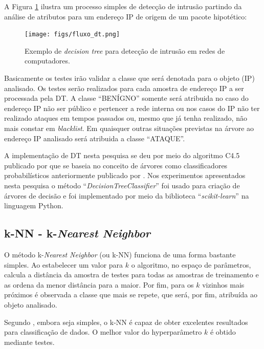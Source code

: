 A Figura \ref{fig:fluxo_dt} ilustra um processo simples de detecção de intrusão partindo da análise de atributos para um endereço IP de origem de um pacote hipotético:

\begin{figure}[H]
\caption{Exemplo de \textit{decision tree} para detecção de intrusão em redes de computadores.}
\centering
\texttt{[image: figs/fluxo\_dt.png]}
\newline {}\label{fig:fluxo_dt}
\end{figure}

Basicamente os testes irão validar a classe que será denotada para o objeto (IP) analisado. Os testes serão realizados para cada amostra de endereço IP a ser processada pela DT. A classe ``BENÍGNO'' somente será atribuida no caso do endereço IP não ser público e pertencer a rede interna ou nos casos do IP não ter realizado ataques em tempos passados ou, mesmo que já tenha realizado, não mais constar em \textit{blacklist}. Em quaisquer outras situações previstas na árvore ao endereço IP analisado será atribuida a classe ``ATAQUE''.

A implementação de DT nesta pesquisa se deu por meio do algoritmo C4.5 publicado por  que se baseia no conceito de árvores como classificadores probabilísticos anteriormente publicado por . Nos experimentos apresentados nesta pesquisa o método ``\textit{DecisionTreeClassifier}'' foi usado para criação de árvores de decisão e foi implementado por meio da biblioteca ``\textit{scikit-learn}'' na linguagem Python.






\subsection{k-NN - k-\textit{Nearest Neighbor}}
\label{knn}
O método k-\textit{Nearest Neighbor} (ou k-NN) funciona de uma forma bastante simples. Ao estabelecer um valor para $k$ o algoritmo, no espaço de parâmetros, calcula a distância da amostra de testes para todas as amostras de treinamento e as ordena da menor distância para a maior. Por fim, para os $k$ vizinhos mais próximos é observada a classe que mais se repete, que será, por fim, atribuída ao objeto analisado.

Segundo , embora seja simples, o k-NN é capaz de obter excelentes resultados para classificação de dados. O melhor valor do hyperparâmetro $k$ é obtido mediante testes.

